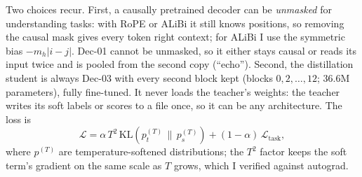 \documentclass[11pt, oneside]{article}
\begin{document}
Two choices recur. First, a causally pretrained decoder can be \emph{unmasked} for understanding tasks: with RoPE or ALiBi it still knows positions, so removing the causal mask gives every token right context; for ALiBi I use the symmetric bias $-m_h|i-j|$. Dec-01 cannot be unmasked, so it either stays causal or reads its input twice and is pooled from the second copy (``echo''). Second, the distillation student is always Dec-03 with every second block kept (blocks $0,2,\dots,12$; 36.6M parameters), fully fine-tuned. It never loads the teacher's weights: the teacher writes its soft labels or scores to a file once, so it can be any architecture. The loss is
\begin{equation}
\mathcal{L} = \alpha\,T^2\,\mathrm{KL}\!\left(p_t^{(T)} \,\|\, p_s^{(T)}\right) + (1-\alpha)\,\mathcal{L}_\text{task},
\end{equation}
where $p^{(T)}$ are temperature-softened distributions; the $T^2$ factor keeps the soft term's gradient on the same scale as $T$ grows, which I verified against autograd.
\end{document}
